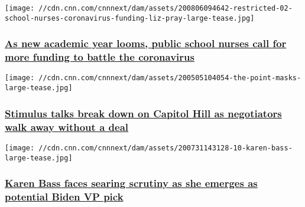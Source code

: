 \href{/2020/08/08/us/school-nurses-coronavirus-funding/index.html}{}

\texttt{[image: //cdn.cnn.com/cnnnext/dam/assets/200806094642-restricted-02-school-nurses-coronavirus-funding-liz-pray-large-tease.jpg]}

\hypertarget{as-new-academic-year-looms-public-school-nurses-call-for-more-funding-to-battle-the-coronavirus}{%
\subsubsection{\texorpdfstring{\href{/2020/08/08/us/school-nurses-coronavirus-funding/index.html}{As
new academic year looms, public school nurses call for more funding to
battle the
coronavirus}}{As new academic year looms, public school nurses call for more funding to battle the coronavirus}}\label{as-new-academic-year-looms-public-school-nurses-call-for-more-funding-to-battle-the-coronavirus}}

\href{/2020/08/07/politics/stimulus-talks-coronavirus/index.html}{}

\texttt{[image: //cdn.cnn.com/cnnnext/dam/assets/200505104054-the-point-masks-large-tease.jpg]}

\hypertarget{stimulus-talks-break-down-on-capitol-hill-as-negotiators-walk-away-without-a-deal-}{%
\subsubsection{\texorpdfstring{\href{/2020/08/07/politics/stimulus-talks-coronavirus/index.html}{Stimulus
talks break down on Capitol Hill as negotiators walk away without a deal
}}{Stimulus talks break down on Capitol Hill as negotiators walk away without a deal }}\label{stimulus-talks-break-down-on-capitol-hill-as-negotiators-walk-away-without-a-deal-}}

\href{/2020/08/07/politics/karen-bass-scrutiny-biden-vice-presidential-pick/index.html}{}

\texttt{[image: //cdn.cnn.com/cnnnext/dam/assets/200731143128-10-karen-bass-large-tease.jpg]}

\hypertarget{karen-bass-faces-searing-scrutiny-as-she-emerges-as-potential-biden-vp-pick}{%
\subsubsection{\texorpdfstring{\href{/2020/08/07/politics/karen-bass-scrutiny-biden-vice-presidential-pick/index.html}{Karen
Bass faces searing scrutiny as she emerges as potential Biden VP
pick}}{Karen Bass faces searing scrutiny as she emerges as potential Biden VP pick}}\label{karen-bass-faces-searing-scrutiny-as-she-emerges-as-potential-biden-vp-pick}}


